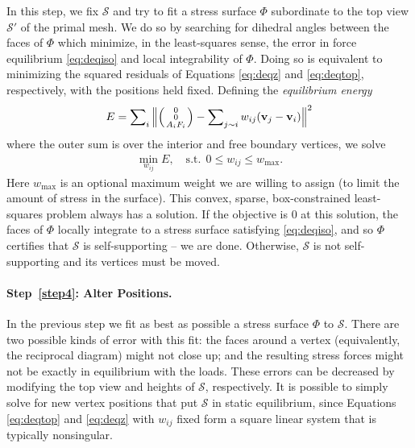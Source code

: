\documentclass[review]{acmsiggraph}
\makeatletter
\def\Forcevector{\Big(\mbox{\scriptsize
	\def\arraystretch{0.8}\begin{tabular}{@{\,}c@{\,}}
	0 \\ 0 \\ $A_i F_i$
	\end{tabular}}\Big)}
\def\SS{{\mathcal S}}
\makeatother
\begin{document}
In this step, we fix $\SS$ and try to fit a stress surface $\Phi$ 
subordinate to the top view $\SS'$ of the primal mesh. We do so by 
searching for dihedral angles between the faces of $\Phi$ which minimize, 
in the least-squares sense, the error in force equilibrium 
\eqref{eq:deqiso} and local integrability of $\Phi$. Doing so is 
equivalent to minimizing the squared residuals of Equations 
\eqref{eq:deqz} and \eqref{eq:deqtop}, respectively, with the positions 
held fixed. Defining the {\em equilibrium energy}
	\begin{align}
	E = \sum\nolimits_i \Big\| \Forcevector -
		\sum\nolimits_{j\sim i} w_{ij} (\vw_j-\vw_i) \Big\|^2
	\label{eq:eenergy}
	\end{align}
 where the outer sum is over the interior and free boundary vertices,
we solve
	\begin{align}
	\min_{w_{ij}} E,
	\quad
	\textrm{s.t.}\ \
		0 \leq w_{ij} \leq w_{\max}.
	\label{eq:wbounds}
	\end{align}
 Here $w_{\max}$ is an optional maximum weight we are willing to assign 
(to limit the amount of stress in the surface). This convex, sparse, 
box-constrained least-squares problem \cite{BCLS} always has a solution. 
If the objective is $0$ at this solution, the faces of $\Phi$ locally 
integrate to a stress surface satisfying \eqref{eq:deqiso}, and so $\Phi$ 
certifies that $\SS$ is self-supporting -- we are done. Otherwise, $\SS$ 
is not self-supporting and its vertices must be moved.

\paragraph{Step~\ref{step4}: Alter Positions.} In the previous step we fit 
as best as possible a stress surface $\Phi$ to $\SS$. There are two 
possible kinds of error with this fit: the faces around a vertex 
(equivalently, the reciprocal diagram) might not close up; and the 
resulting stress forces might not be exactly in equilibrium with the 
loads. These errors can be decreased by modifying the top view and heights 
of $\SS$, respectively. It is possible to simply solve for new vertex 
positions that put $\SS$ in static equilibrium, since Equations 
\eqref{eq:deqtop} and \eqref{eq:deqz} with $w_{ij}$ fixed form a square 
linear system that is typically nonsingular.
\end{document}
